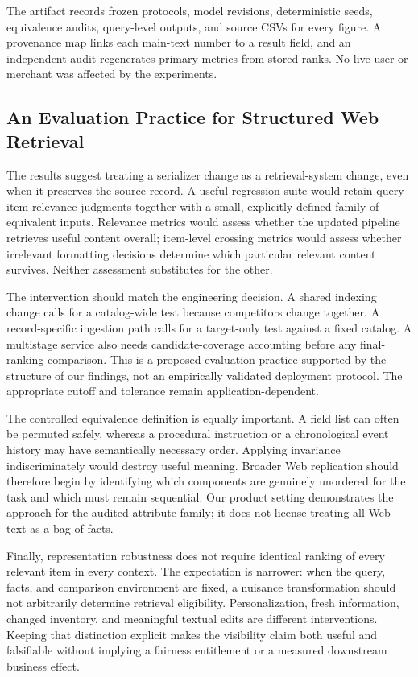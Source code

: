 The artifact records frozen protocols, model revisions, deterministic seeds, equivalence audits, query-level outputs, and source CSVs for every figure. A provenance map links each main-text number to a result field, and an independent audit regenerates primary metrics from stored ranks. No live user or merchant was affected by the experiments.

\subsection{An Evaluation Practice for Structured Web Retrieval}

The results suggest treating a serializer change as a retrieval-system change, even when it preserves the source record. A useful regression suite would retain query--item relevance judgments together with a small, explicitly defined family of equivalent inputs. Relevance metrics would assess whether the updated pipeline retrieves useful content overall; item-level crossing metrics would assess whether irrelevant formatting decisions determine which particular relevant content survives. Neither assessment substitutes for the other.

The intervention should match the engineering decision. A shared indexing change calls for a catalog-wide test because competitors change together. A record-specific ingestion path calls for a target-only test against a fixed catalog. A multistage service also needs candidate-coverage accounting before any final-ranking comparison. This is a proposed evaluation practice supported by the structure of our findings, not an empirically validated deployment protocol. The appropriate cutoff and tolerance remain application-dependent.

The controlled equivalence definition is equally important. A field list can often be permuted safely, whereas a procedural instruction or a chronological event history may have semantically necessary order. Applying invariance indiscriminately would destroy useful meaning. Broader Web replication should therefore begin by identifying which components are genuinely unordered for the task and which must remain sequential. Our product setting demonstrates the approach for the audited attribute family; it does not license treating all Web text as a bag of facts.

Finally, representation robustness does not require identical ranking of every relevant item in every context. The expectation is narrower: when the query, facts, and comparison environment are fixed, a nuisance transformation should not arbitrarily determine retrieval eligibility. Personalization, fresh information, changed inventory, and meaningful textual edits are different interventions. Keeping that distinction explicit makes the visibility claim both useful and falsifiable without implying a fairness entitlement or a measured downstream business effect.

